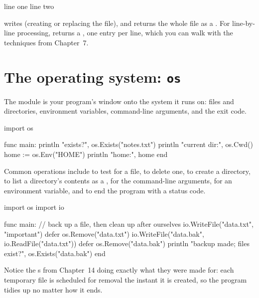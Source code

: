 \begin{progout}
line one
line two
\end{progout}

 writes (creating or replacing the file), and
 returns the whole file as a . For
line-by-line processing,  returns a , one
entry per line, which you can walk with the techniques from Chapter~7.

\section{The operating system: \texttt{os}}

The  module is your program's window onto the system it runs on: files
and directories, environment variables, command-line arguments, and the exit
code.

\begin{salamen}
import os

func main:
    println "exists?", os.Exists("notes.txt")
    println "current dir:", os.Cwd()
    home := os.Env("HOME")
    println "home:", home
end
\end{salamen}

\begin{sloppypar}
Common  operations include  to test for a file,
 to delete one,  to create a directory,
 to list a directory's contents as a ,
 for the command-line arguments,  for an
environment variable, and  to end the program with a status
code.
\end{sloppypar}

\begin{salamen}
import os
import io

func main:
    // back up a file, then clean up after ourselves
    io.WriteFile("data.txt", "important\n")
    defer os.Remove("data.txt")
    io.WriteFile("data.bak", io.ReadFile("data.txt"))
    defer os.Remove("data.bak")
    println "backup made; files exist?", os.Exists("data.bak")
end
\end{salamen}

Notice the s from Chapter~14 doing exactly what they were made for:
each temporary file is scheduled for removal the instant it is created, so the
program tidies up no matter how it ends.

